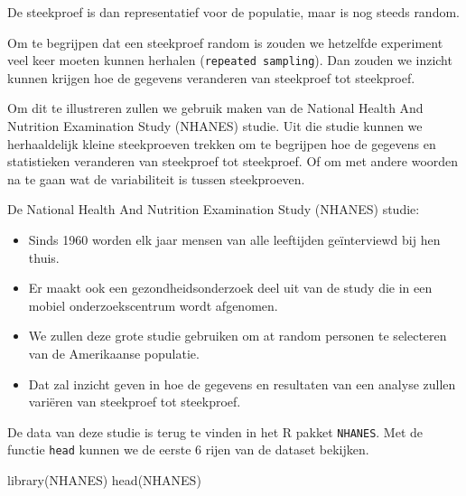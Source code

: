 \documentclass[
  dutch,
  letterpaper,
  12pt]{book}
\newenvironment{Shaded}{\begin{snugshade}}{\end{snugshade}}
\newcommand{\FunctionTok}[1]{\textcolor[rgb]{0.28,0.35,0.67}{#1}}
\newcommand{\NormalTok}[1]{\textcolor[rgb]{0.00,0.23,0.31}{#1}}
\theoremstyle{definition}
\theoremstyle{definition}
\theoremstyle{definition}
\theoremstyle{remark}
\begin{document}
De steekproef is dan representatief voor de populatie, maar is nog
steeds random.

Om te begrijpen dat een steekproef random is zouden we hetzelfde
experiment veel keer moeten kunnen herhalen
(\texttt{repeated\ sampling}). Dan zouden we inzicht kunnen krijgen hoe
de gegevens veranderen van steekproef tot steekproef.

Om dit te illustreren zullen we gebruik maken van de National Health And
Nutrition Examination Study (NHANES) studie. Uit die studie kunnen we
herhaaldelijk kleine steekproeven trekken om te begrijpen hoe de
gegevens en statistieken veranderen van steekproef tot steekproef. Of om
met andere woorden na te gaan wat de variabiliteit is tussen
steekproeven.

De National Health And Nutrition Examination Study (NHANES) studie:

\begin{itemize}
\item
  Sinds 1960 worden elk jaar mensen van alle leeftijden geïnterviewd bij
  hen thuis.
\item
  Er maakt ook een gezondheidsonderzoek deel uit van de study die in een
  mobiel onderzoekscentrum wordt afgenomen.
\item
  We zullen deze grote studie gebruiken om at random personen te
  selecteren van de Amerikaanse populatie.
\item
  Dat zal inzicht geven in hoe de gegevens en resultaten van een analyse
  zullen variëren van steekproef tot steekproef.
\end{itemize}

De data van deze studie is terug te vinden in het R pakket
\texttt{NHANES}. Met de functie \texttt{head} kunnen we de eerste 6
rijen van de dataset bekijken.

\begin{Shaded}
\begin{Highlighting}[]
\FunctionTok{library}\NormalTok{(NHANES)}
\FunctionTok{head}\NormalTok{(NHANES)}
\end{Highlighting}
\end{Shaded}
\end{document}
